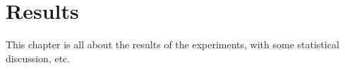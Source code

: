 \chapter{Results}
This chapter is all about the results of the experiments, with some statistical discussion, etc.
